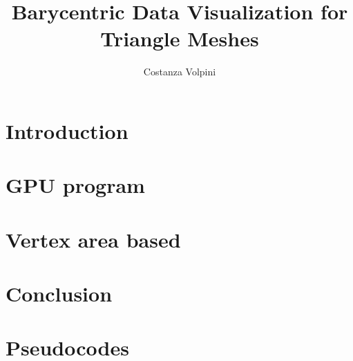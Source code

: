 \documentclass[]{usiinfbachelorproject}
\author{Costanza Volpini}
\title{Barycentric Data Visualization for Triangle Meshes}
\begin{document}
\maketitle






\section{Introduction}


\section{GPU program}


\section{Vertex area based}



\section{Conclusion}






\appendix
\section{Pseudocodes}

\end{document}
